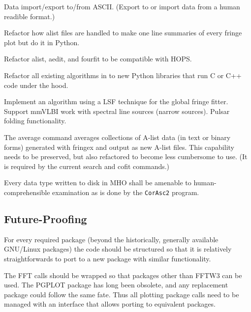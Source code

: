 \begin{description}
 Data import/export to/from ASCII. (Export to or import data
    from a human readible format.)

 Refactor how alist files are handled to make one line
    summaries of every fringe plot but do it in Python.

 Refactor alist, aedit, and fourfit to be compatible with \ac{HOPS}.

 Refactor all existing algorithms in to new Python libraries
    that run C or C++ code under the hood.

 Implement an algorithm using a \ac{LSF} %
    technique for the global fringe fitter.
 Support mmVLBI work with spectral line sources (narrow sources).
 Pulsar folding functionality.

 The \ac{average} command averages collections of \ac{A-list} data
    (in text or binary forms) generated with \ac{fringex} and output as
    new \ac{A-list} files.  This capability needs to be preserved, but
    also refactored to become less cumbersome to use.  (It is required
    by the current \ac{search} and \ac{cofit} commands.)

 Every data type written to disk in \ac{MHO} shall be 
    amenable to human-comprehensible examination as is done by the
    \texttt{\ac{CorAsc2}} program.

\end{description}

\subsection{Future-Proofing}
\label{sec:future}

For every required package (beyond the historically, generally
available \ac{GNU/Linux} packages) the code should be structured so
that it is relatively straightforwards to port to a new package with
similar functionality.

\begin{description}
 The \ac{FFT} calls should be wrapped so that packages other than
    \ac{FFTW3} can be used.
 The \ac{PGPLOT} package has long been obsolete, and any replacement
    package could follow the same fate.  Thus all plotting package calls
    need to be managed with an interface that allows porting to equivalent
    packages.
\end{description}

%
%
